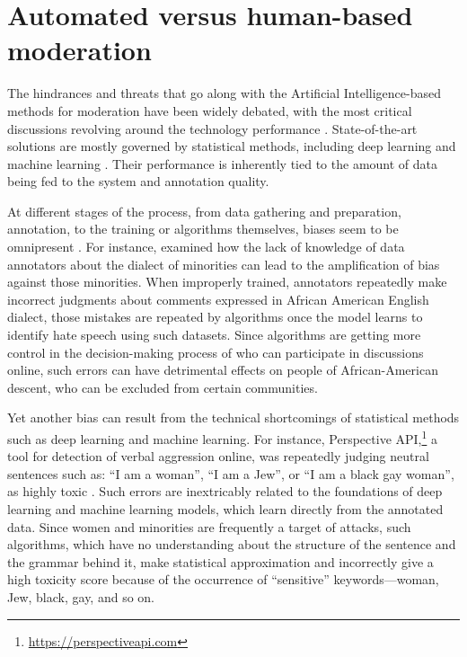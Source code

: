 \documentclass[preprint,12pt]{elsarticle}
\begin{document}
\tableofcontents











\section{Automated versus human-based moderation}\label{sec:automated-versus-human}

The hindrances and threats that go along with the Artificial Intelligence-based methods for moderation have been widely debated, with the most critical discussions revolving around the technology performance \citep{macavaney2019hate, schmidt2017survey}. 
State-of-the-art solutions are mostly governed by statistical methods, including deep learning and machine learning \citep{jordan2015machine, lecun2015deep, sejnowski2020unreasonable}. Their performance is inherently tied to the amount of data being fed to the system and annotation quality.

At different stages of the process, from data gathering and preparation, annotation,  to the training or algorithms themselves, biases seem to be omnipresent \citep{binns2017like, geva2019we, mehrabi2021survey}. For instance, \citet{sap_risk_2019} examined how the lack of knowledge of data annotators about the dialect of minorities can lead to the amplification of bias against those minorities. When improperly trained, annotators repeatedly make incorrect judgments about comments expressed in African American English dialect, those mistakes are repeated by algorithms once the model learns to identify hate speech using such datasets. Since algorithms are getting more control in the decision-making process of who can participate in discussions online, such errors can have detrimental effects on people of African-American descent, who can be excluded from certain communities.

Yet another bias can result from the technical shortcomings of statistical methods such as deep learning and machine learning. For instance, Perspective API,\footnote{\url{https://perspectiveapi.com}} a tool for detection of verbal aggression online, was repeatedly judging neutral sentences such as: “I am a woman”, “I am a Jew”, or “I am a black gay woman”, as highly toxic \citep{jigsaw2019}. Such errors are inextricably related to the foundations of deep learning and machine learning models, which learn directly from the annotated data. Since women and minorities are frequently a target of attacks, such algorithms, which have no understanding about the structure of the sentence and the grammar behind it, make statistical approximation and incorrectly give a high toxicity score because of the occurrence of “sensitive” keywords—woman, Jew, black, gay, and so on.
\end{document}
